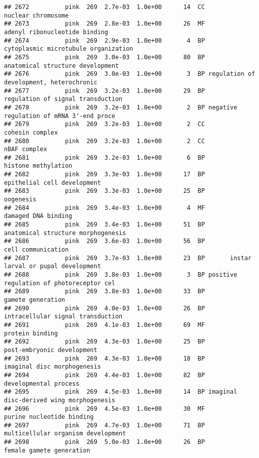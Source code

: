 \documentclass[]{article}
\begin{document}
\begin{verbatim}
## 2672          pink  269  2.7e-03  1.0e+00      14  CC                       nuclear chromosome
## 2673          pink  269  2.8e-03  1.0e+00      26  MF            adenyl ribonucleotide binding
## 2674          pink  269  2.9e-03  1.0e+00       4  BP     cytoplasmic microtubule organization
## 2675          pink  269  3.0e-03  1.0e+00      80  BP         anatomical structure development
## 2676          pink  269  3.0e-03  1.0e+00       3  BP regulation of development, heterochronic
## 2677          pink  269  3.2e-03  1.0e+00      29  BP        regulation of signal transduction
## 2678          pink  269  3.2e-03  1.0e+00       2  BP negative regulation of mRNA 3'-end proce
## 2679          pink  269  3.2e-03  1.0e+00       2  CC                          cohesin complex
## 2680          pink  269  3.2e-03  1.0e+00       2  CC                             nBAF complex
## 2681          pink  269  3.2e-03  1.0e+00       6  BP                      histone methylation
## 2682          pink  269  3.3e-03  1.0e+00      17  BP              epithelial cell development
## 2683          pink  269  3.3e-03  1.0e+00      25  BP                                oogenesis
## 2684          pink  269  3.4e-03  1.0e+00       4  MF                      damaged DNA binding
## 2685          pink  269  3.4e-03  1.0e+00      51  BP       anatomical structure morphogenesis
## 2686          pink  269  3.6e-03  1.0e+00      56  BP                       cell communication
## 2687          pink  269  3.7e-03  1.0e+00      23  BP       instar larval or pupal development
## 2688          pink  269  3.8e-03  1.0e+00       3  BP positive regulation of photoreceptor cel
## 2689          pink  269  3.8e-03  1.0e+00      33  BP                        gamete generation
## 2690          pink  269  4.0e-03  1.0e+00      26  BP        intracellular signal transduction
## 2691          pink  269  4.1e-03  1.0e+00      69  MF                          protein binding
## 2692          pink  269  4.3e-03  1.0e+00      25  BP               post-embryonic development
## 2693          pink  269  4.3e-03  1.0e+00      18  BP              imaginal disc morphogenesis
## 2694          pink  269  4.4e-03  1.0e+00      82  BP                    developmental process
## 2695          pink  269  4.5e-03  1.0e+00      14  BP imaginal disc-derived wing morphogenesis
## 2696          pink  269  4.5e-03  1.0e+00      30  MF                purine nucleotide binding
## 2697          pink  269  4.7e-03  1.0e+00      71  BP       multicellular organism development
## 2698          pink  269  5.0e-03  1.0e+00      26  BP                 female gamete generation

\end{verbatim}
\end{document}
